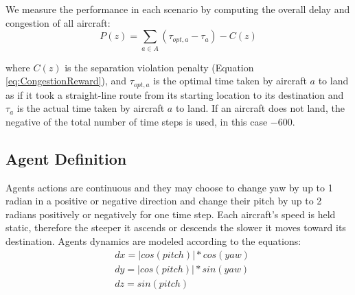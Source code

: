 \documentclass{sig-alternate}
\begin{document}
We measure the performance in each scenario by computing the overall delay and congestion of all aircraft:
%
\begin{equation}
P(z) = \sum_{a \in A}{(\tau_{opt, a} - \tau_a) - C(z)}
\end{equation}

where $C(z)$ is the separation violation penalty (Equation \ref{eq:CongestionReward}), and $\tau_{opt, a}$ is the optimal time taken by aircraft $a$ to land as if it took a straight-line route from its starting location to its destination and $\tau_a$ is the actual time taken by aircraft $a$ to land. If an aircraft does not land, the negative of the total number of time steps is used, in this case $-600$. 


\subsection{Agent Definition}
Agents actions are continuous and they may choose to change yaw by up to 1 radian in a positive or negative direction and change their pitch by up to 2 radians positively or negatively for one time step. Each aircraft's speed is held static, therefore the steeper it ascends or descends the slower it moves toward its destination. Agents dynamics are modeled according to the equations:
%
\begin{equation}
\begin{split}
&dx = |cos(pitch)| * cos(yaw) \\
&dy = |cos(pitch)| * sin(yaw) \\
&dz = sin(pitch) \\
\end{split}
\end{equation}
\end{document}
